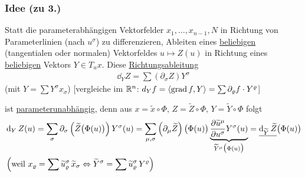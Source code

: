 \subsubsection*{Idee (zu 3.)}
Statt die parameterabhängigen Vektorfelder \(x_1, \dots, x_{n-1}, N\) in Richtung von Parameterlinien (nach \(u^\sigma\)) zu differenzieren, Ableiten eines \uline{beliebigen} (tangentialen oder normalen) Vektorfeldes \(u \mapsto Z(u)\) in Richtung eines \uline{beliebigen} Vektors \(Y \in T_u x\). Diese \uline{Richtungsableitung}
\begin{align*}
 \boxed{\dd_Y Z = \sum (\partial_\sigma Z) Y^\sigma}
\end{align*}
(mit \(Y = \sum Y^\sigma x_\sigma\)) [vergleiche im \(\mathbb{R}^n\): \(d_Y f = \langle \operatorname{grad} f, Y \rangle = \sum \partial_\varrho f \cdot Y^\varrho\)]\par
ist \uline{parameterunabhängig}, denn aus \(x = \widetilde x \circ \Phi, \, Z = \widetilde Z \circ \Phi, \, Y = \widetilde Y \circ \Phi\) folgt	
\begin{align*}
 &\dd_Y Z(u) = \sum_\sigma \partial_\sigma \left( \widetilde Z \big( \Phi(u)\big)\right) Y^\sigma(u) = \sum_{\mu,\sigma} \left( \partial_\mu \widetilde Z\right) \big(\Phi(u)\big) \underbrace{\frac{\partial \widetilde u^\mu}{\partial u^\sigma} Y^\sigma(u)}_{\widetilde Y^\mu \big(\Phi(u)\big)} = \uline{\dd_{\widetilde Y} \widetilde Z} \big(\Phi(u)\big) \\
 &\left(\text{weil } x_\varrho = \sum \widetilde u_\varrho^\sigma \,\widetilde x_\sigma \Leftrightarrow \widetilde Y^\sigma = \sum \widetilde u_\varrho^\sigma \, Y^\varrho\right)
\end{align*}

